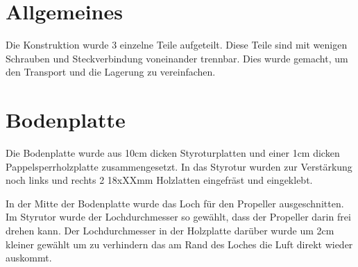 \section{Allgemeines}
Die Konstruktion wurde 3 einzelne Teile aufgeteilt. Diese Teile sind mit wenigen Schrauben und Steckverbindung voneinander trennbar. Dies wurde gemacht, um den Transport und die Lagerung zu vereinfachen.

\newpage
\section{Bodenplatte}
Die Bodenplatte wurde aus 10cm dicken Styroturplatten und einer 1cm dicken Pappelsperrholzplatte zusammengesetzt. In das Styrotur wurden zur Verstärkung noch links und rechts 2 18xXXmm Holzlatten eingefräst und eingeklebt. 

In der Mitte der Bodenplatte wurde das Loch für den Propeller ausgeschnitten. Im Styrutor wurde der Lochdurchmesser so gewählt, dass der Propeller darin frei drehen kann. Der Lochdurchmesser in der Holzplatte darüber wurde um 2cm kleiner gewählt um zu verhindern das am Rand des Loches die Luft direkt wieder auskommt.